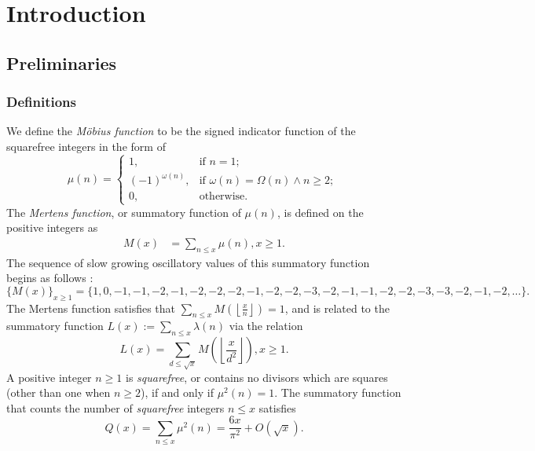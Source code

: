 \documentclass[11pt,reqno,a4letter]{article}
\numberwithin{figure}{section}
\numberwithin{table}{section}
\newcommand{\seqnum}[1]{\href{http://oeis.org/#1}{\color{ProcessBlue}{\underline{#1}}}}
\newcommand{\Floor}[2]{\ensuremath{\left\lfloor \frac{#1}{#2} \right\rfloor}}
\theoremstyle{plain}
\numberwithin{theorem}{section}
\theoremstyle{definition}
\begin{document}
\newpage
\renewcommand{\contentsname}{Article Index}
\tableofcontents

\newpage
\section{Introduction} 
\label{subSection_MertensMxClassical_Intro} 

\subsection{Preliminaries}

\subsubsection{Definitions} 

We define the \emph{M\"obius function} to be the signed indicator function 
of the squarefree integers in the form of \cite[\seqnum{A008683}]{OEIS} 
\[
\mu(n) = \begin{cases} 
     1, & \text{if $n = 1$; } \\ 
     (-1)^{\omega(n)}, & \text{if $\omega(n) = \Omega(n) \wedge n \geq 2$; } \\ 
     0, & \text{otherwise.} 
     \end{cases} 
\]
The \emph{Mertens function}, or summatory function of $\mu(n)$, is defined on the 
positive integers as 
\begin{align*} 
M(x) & = \sum_{n \leq x} \mu(n), x \geq 1. 
\end{align*} 
The sequence of slow growing oscillatory values of this 
summatory function begins as follows \cite[\seqnum{A002321}]{OEIS}: 
\[
\{M(x)\}_{x \geq 1} = \{1, 0, -1, -1, -2, -1, -2, -2, -2, -1, -2, -2, -3, -2, 
     -1, -1, -2, -2, -3, -3, -2, -1, -2, \ldots\}. 
\] 
The Mertens function satisfies that $\sum_{n \leq x} M\left(\Floor{x}{n}\right) = 1$, and is related 
to the summatory function $L(x) := \sum_{n \leq x} \lambda(n)$ via the relation 
\cite{HUMPHRIES-JNT-2013,LEHMAN-1960} 
\[
L(x) = \sum_{d \leq \sqrt{x}} M\left(\Floor{x}{d^2}\right), x \geq 1. 
\]
A positive integer $n \geq 1$ is \emph{squarefree}, or contains no divisors 
which are squares (other than one when $n \geq 2$), if and only if $\mu^2(n) = 1$. 
The summatory function that counts the 
number of \emph{squarefree} integers $n \leq x$ satisfies 
\cite[\S 18.6]{HARDYWRIGHT} \cite[\seqnum{A013928}]{OEIS} 
\[ 
Q(x) = \sum_{n \leq x} \mu^2(n) = \frac{6x}{\pi^2} + O\left(\sqrt{x}\right). 
\] 
\end{document}
